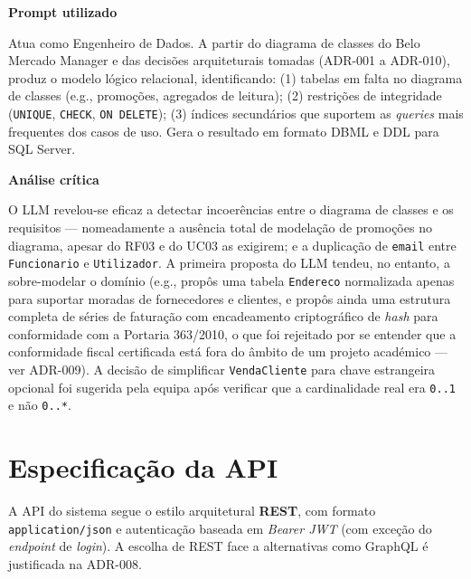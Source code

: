     \begin{tcolorbox}[title=Interação com o LLM]
    \textbf{Prompt utilizado}

    Atua como Engenheiro de Dados. A partir do diagrama de classes do Belo Mercado Manager e das decisões arquiteturais tomadas (ADR-001 a ADR-010), produz o modelo lógico relacional, identificando: (1) tabelas em falta no diagrama de classes (e.g., promoções, agregados de leitura); (2) restrições de integridade (\texttt{UNIQUE}, \texttt{CHECK}, \texttt{ON DELETE}); (3) índices secundários que suportem as \textit{queries} mais frequentes dos casos de uso. Gera o resultado em formato DBML e DDL para SQL Server.

    \tcblower

    \textbf{Análise crítica}

    O LLM revelou-se eficaz a detectar incoerências entre o diagrama de classes e os requisitos --- nomeadamente a ausência total de modelação de promoções no diagrama, apesar do RF03 e do UC03 as exigirem; e a duplicação de \texttt{email} entre \texttt{Funcionario} e \texttt{Utilizador}. A primeira proposta do LLM tendeu, no entanto, a sobre-modelar o domínio (e.g., propôs uma tabela \texttt{Endereco} normalizada apenas para suportar moradas de fornecedores e clientes, e propôs ainda uma estrutura completa de séries de faturação com encadeamento criptográfico de \textit{hash} para conformidade com a Portaria 363/2010, o que foi rejeitado por se entender que a conformidade fiscal certificada está fora do âmbito de um projeto académico --- ver ADR-009). A decisão de simplificar \texttt{VendaCliente} para chave estrangeira opcional foi sugerida pela equipa após verificar que a cardinalidade real era \texttt{0..1} e não \texttt{0..*}.
    \end{tcolorbox}

\section{Especificação da API}
\label{sec:api}

    A API do sistema segue o estilo arquitetural \textbf{REST}, com formato \texttt{application/json} e autenticação baseada em \textit{Bearer JWT} (com exceção do \textit{endpoint} de \textit{login}). A escolha de REST face a alternativas como GraphQL é justificada na ADR-008.

